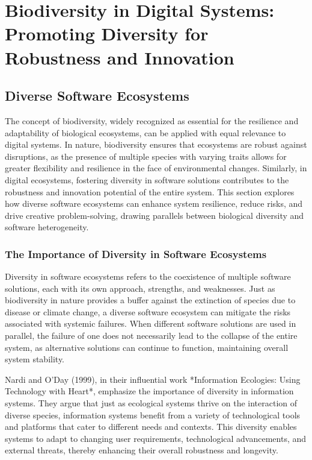 \documentclass[12pt,twoside]{article}
\begin{document}
\section{Biodiversity in Digital Systems: Promoting Diversity for Robustness and Innovation}

\subsection{Diverse Software Ecosystems}

The concept of biodiversity, widely recognized as essential for the resilience and adaptability of biological ecosystems, can be applied with equal relevance to digital systems. In nature, biodiversity ensures that ecosystems are robust against disruptions, as the presence of multiple species with varying traits allows for greater flexibility and resilience in the face of environmental changes. Similarly, in digital ecosystems, fostering diversity in software solutions contributes to the robustness and innovation potential of the entire system. This section explores how diverse software ecosystems can enhance system resilience, reduce risks, and drive creative problem-solving, drawing parallels between biological diversity and software heterogeneity.

\subsubsection{The Importance of Diversity in Software Ecosystems}

Diversity in software ecosystems refers to the coexistence of multiple software solutions, each with its own approach, strengths, and weaknesses. Just as biodiversity in nature provides a buffer against the extinction of species due to disease or climate change, a diverse software ecosystem can mitigate the risks associated with systemic failures. When different software solutions are used in parallel, the failure of one does not necessarily lead to the collapse of the entire system, as alternative solutions can continue to function, maintaining overall system stability.

Nardi and O'Day (1999), in their influential work *Information Ecologies: Using Technology with Heart*, emphasize the importance of diversity in information systems. They argue that just as ecological systems thrive on the interaction of diverse species, information systems benefit from a variety of technological tools and platforms that cater to different needs and contexts. This diversity enables systems to adapt to changing user requirements, technological advancements, and external threats, thereby enhancing their overall robustness and longevity.
\end{document}
